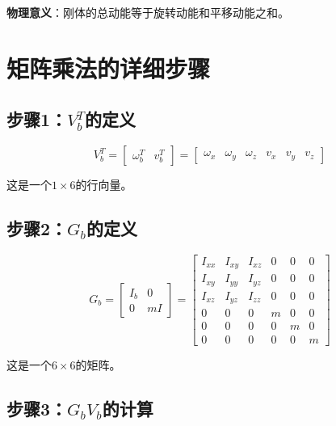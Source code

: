 \documentclass[12pt,a4paper]{article}
\begin{document}
\textbf{物理意义}：刚体的总动能等于旋转动能和平移动能之和。

\section{矩阵乘法的详细步骤}

\subsection{步骤1：$V_b^T$的定义}

\begin{equation}
V_b^T = \begin{bmatrix} \omega_b^T & v_b^T \end{bmatrix} = \begin{bmatrix} \omega_x & \omega_y & \omega_z & v_x & v_y & v_z \end{bmatrix}
\end{equation}

这是一个$1 \times 6$的行向量。

\subsection{步骤2：$G_b$的定义}

\begin{equation}
G_b = \begin{bmatrix}
I_b & 0 \\
0 & mI
\end{bmatrix} = \begin{bmatrix}
I_{xx} & I_{xy} & I_{xz} & 0 & 0 & 0 \\
I_{xy} & I_{yy} & I_{yz} & 0 & 0 & 0 \\
I_{xz} & I_{yz} & I_{zz} & 0 & 0 & 0 \\
0 & 0 & 0 & m & 0 & 0 \\
0 & 0 & 0 & 0 & m & 0 \\
0 & 0 & 0 & 0 & 0 & m
\end{bmatrix}
\end{equation}

这是一个$6 \times 6$的矩阵。

\subsection{步骤3：$G_b V_b$的计算}
\end{document}
